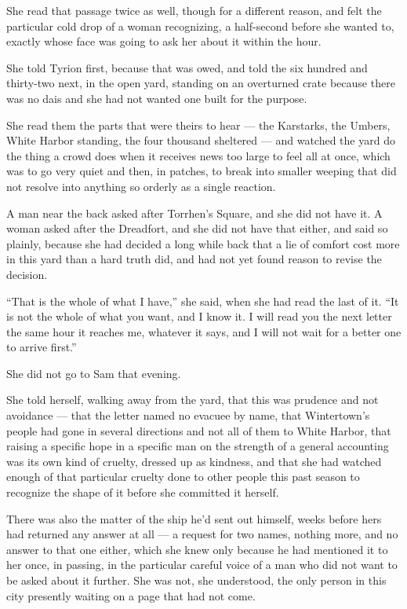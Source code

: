 She read that passage twice as well, though for a different reason, and felt the particular cold drop of a woman recognizing, a half-second before she wanted to, exactly whose face was going to ask her about it within the hour.

\sceneBreak

She told Tyrion first, because that was owed, and told the six hundred and thirty-two next, in the open yard, standing on an overturned crate because there was no dais and she had not wanted one built for the purpose.

She read them the parts that were theirs to hear — the Karstarks, the Umbers, White Harbor standing, the four thousand sheltered — and watched the yard do the thing a crowd does when it receives news too large to feel all at once, which was to go very quiet and then, in patches, to break into smaller weeping that did not resolve into anything so orderly as a single reaction.

A man near the back asked after Torrhen’s Square, and she did not have it. A woman asked after the Dreadfort, and she did not have that either, and said so plainly, because she had decided a long while back that a lie of comfort cost more in this yard than a hard truth did, and had not yet found reason to revise the decision.

“That is the whole of what I have,” she said, when she had read the last of it. “It is not the whole of what you want, and I know it. I will read you the next letter the same hour it reaches me, whatever it says, and I will not wait for a better one to arrive first.”

\sceneBreak

She did not go to Sam that evening.

She told herself, walking away from the yard, that this was prudence and not avoidance — that the letter named no evacuee by name, that Wintertown’s people had gone in several directions and not all of them to White Harbor, that raising a specific hope in a specific man on the strength of a general accounting was its own kind of cruelty, dressed up as kindness, and that she had watched enough of that particular cruelty done to other people this past season to recognize the shape of it before she committed it herself.

There was also the matter of the ship he’d sent out himself, weeks before hers had returned any answer at all — a request for two names, nothing more, and no answer to that one either, which she knew only because he had mentioned it to her once, in passing, in the particular careful voice of a man who did not want to be asked about it further. She was not, she understood, the only person in this city presently waiting on a page that had not come.

